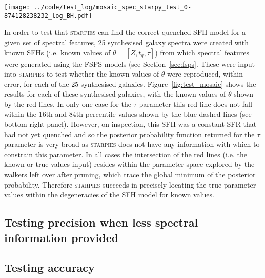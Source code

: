 \documentclass[useAMS,usenatbib]{mn2e}
\def\check		{\color{check}}
\begin{document}
\begin{figure*}
\centering
\texttt{[image: ../code/test\_log/mosaic\_spec\_starpy\_test\_0-874128238232\_log\_BH.pdf]}
\caption{Results from \textsc{starpies} for an array of synthesised galaxies with known true $[Z, t_q, \tau]$ values (marked by the solid red lines) assuming an error on the input spectral measurements of the average error on the measured MaNGA spectra measurements. {\check Pruning has been applied?} In each case \textsc{starpies} has succeeded in locating the true parameter values within the degeneracies of the star formation history model.}
\label{fig:test_mosaic}
\end{figure*}


In order to test that \textsc{starpies} can find the correct quenched SFH model for a given set of spectral features, 25 synthesised galaxy spectra were created with known SFHs (i.e. known values of $\theta = [Z, t_q, \tau]$) from which spectral features were generated using the FSPS models (see Section~\ref{sec:fsps}. These were input into \textsc{starpies} to test whether the known values of $\theta$ were reproduced, within error, for each of the 25 synthesised galaxies. Figure~\ref{fig:test_mosaic} shows the results for each of these synthesised galaxies, with the known values of $\theta$ shown by the red lines. In only one case for the $\tau$ parameter this red line does not fall within the 16th and 84th percentile values shown by the blue dashed lines (see bottom right panel). However, on inspection, this SFH was a constant SFR that had not yet quenched and so the posterior probability function returned for the $\tau$ parameter is very broad as \textsc{starpies} does not have any information with which to constrain this parameter. In all cases the intersection of the red lines (i.e. the known or true values input) resides within the parameter space explored by the walkers left over after pruning, which trace the global minimum of the posterior probability. Therefore \textsc{starpies} succeeds in precisely locating the true parameter values within the degeneracies of the SFH model for known values. 


\subsection{Testing precision when less spectral information provided}

\subsection{Testing accuracy}
\end{document}
